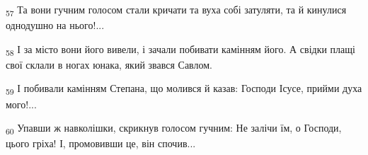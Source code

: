 \begin{tcolorbox}
\textsubscript{57} Та вони гучним голосом стали кричати та вуха собі затуляти, та й кинулися однодушно на нього!...
\end{tcolorbox}
\begin{tcolorbox}
\textsubscript{58} І за місто вони його вивели, і зачали побивати камінням його. А свідки плащі свої склали в ногах юнака, який звався Савлом.
\end{tcolorbox}
\begin{tcolorbox}
\textsubscript{59} І побивали камінням Степана, що молився й казав: Господи Ісусе, прийми духа мого!...
\end{tcolorbox}
\begin{tcolorbox}
\textsubscript{60} Упавши ж навколішки, скрикнув голосом гучним: Не залічи їм, о Господи, цього гріха! І, промовивши це, він спочив...
\end{tcolorbox}
